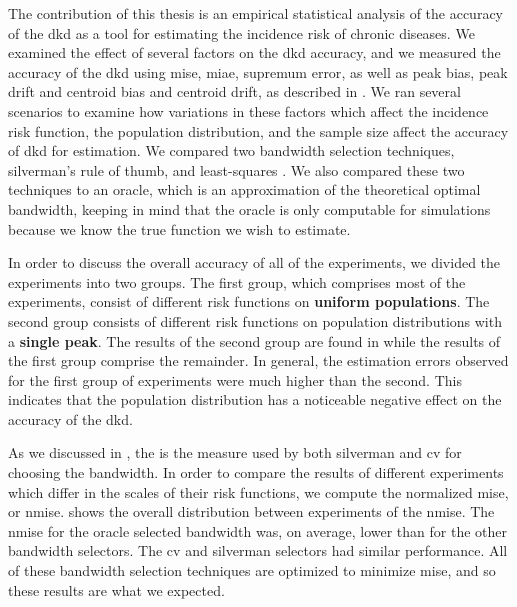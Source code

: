 

The contribution of this thesis is an empirical statistical analysis of the accuracy of the \gls{dkd}
as a tool for estimating the incidence risk of chronic diseases.
We examined the effect of several factors on the \gls{dkd} accuracy,
and we measured the accuracy of the \gls{dkd} using \gls{mise},
\gls{miae}, \gls{supremum error}, as well as \gls{peak bias}, \gls{peak drift} and \gls{centroid bias} and \gls{centroid drift},
as described in .
We ran several scenarios to examine how variations in these factors which affect the incidence risk function,
the population distribution, and the sample size affect the accuracy of \gls{dkd} for estimation.
We compared two bandwidth selection techniques, \gls{silverman}'s rule of thumb,
and least-squares .
We also compared these two techniques to an \gls{oracle},
which is an approximation of the theoretical optimal bandwidth,
keeping in mind that the oracle is only computable for simulations because we know the true function we wish to estimate.

In order to discuss the overall accuracy of all of the experiments,
we divided the experiments into two groups.
The first group, which comprises most of the experiments,
consist of different \gls{risk} functions on \textbf{uniform populations}.
The second group consists of different \gls{risk} functions on population distributions with a \textbf{single peak}.
The results of the second group are found in  while the results of the first group comprise the remainder.
In general, the estimation errors observed for the first group of experiments were much higher than the second.
This indicates that the population distribution has a noticeable negative effect on the accuracy of the \gls{dkd}.

As we discussed in ,
the  is the measure used by both \gls{silverman} and \gls{cv} for choosing the bandwidth.
In order to compare the results of different experiments which differ in the scales of their \gls{risk} functions,
we compute the normalized \gls{mise}, or \gls{nmise}. 
 shows the overall distribution between experiments of the \gls{nmise}.
The \gls{nmise} for the \gls{oracle} selected bandwidth was, on average,
lower than for the other bandwidth selectors.
The \gls{cv} and \gls{silverman} selectors had similar performance.
All of these bandwidth selection techniques are optimized to minimize \gls{mise},
and so these results are what we expected.


